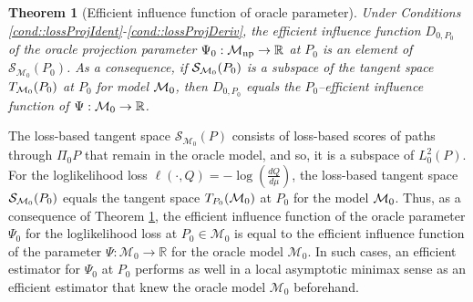 \documentclass[11pt]{article}
\newtheorem{theorem}{Theorem}
\theoremstyle{definition}
\begin{document}
 \begin{theorem}[Efficient influence function of oracle parameter]
 Under Conditions \ref{cond::lossProjIdent}-\ref{cond::lossProjDeriv},  the efficient influence function $D_{0,P_{0}}$ of the oracle projection parameter $\Psi_0 :{\cal M}_{\mathrm{np}}\rightarrow\mathbb{R}$ at $P_0$ is an element of $\mathcal{S}_{\mathcal{M}_0}(P_0)$.
As a consequence, if $\mathcal{S}_{{\cal M}_0}(P_0)$ is a subspace of the tangent space $T_{{\cal M}_0}(P_0)$ at $P_0$ for model ${\cal M}_0$, then $D_{0,P_0}$ equals the $P_0$--efficient influence function of $\Psi:{\cal M}_0\rightarrow\mathbb{R}$. 
\label{theorem::lossbasedEIF}
\end{theorem}


 The loss-based tangent space $\mathcal{S}_{\mathcal{M}_0}(P)$ consists of loss-based scores of paths through $\Pi_0P$ that remain in the oracle model, and so, it is a subspace of $L^2_0(P)$. For the loglikelihood loss $\ell(\cdot, Q)=-\log\left(\frac{dQ}{d\mu}\right)$, the loss-based tangent space $\mathcal{S}_{{\cal M}_0}(P_0)$ equals the tangent space $T_{P_0}({\cal M}_0)$ at $P_0$ for the model ${\cal M}_0$. Thus, as a consequence of Theorem \ref{theorem::lossbasedEIF}, the efficient influence function of the oracle parameter $\Psi_0$ for the loglikelihood loss at $P_0 \in \mathcal{M}_0$ is equal to the efficient influence function of the parameter $\Psi: \mathcal{M}_0 \rightarrow \mathbb{R}$ for the oracle model $\mathcal{M}_0$. In such cases, an efficient estimator for $\Psi_0$ at $P_0$ performs as well in a local asymptotic minimax sense as an efficient estimator that knew the oracle model $\mathcal{M}_0$ beforehand. 


 
 
\end{document}
